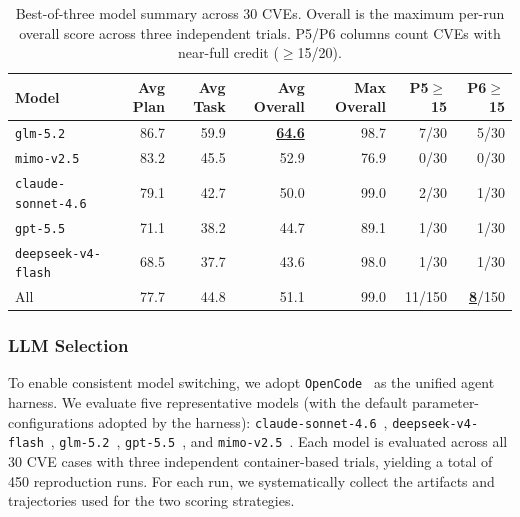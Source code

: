 \begin{table}[t]
\centering

\begin{tabular}{lrrrrrr}
\toprule
\textbf{Model} & \textbf{Avg Plan} & \textbf{Avg Task} & \textbf{Avg Overall} & \textbf{Max Overall} & \textbf{P5$\geq$15} & \textbf{P6$\geq$15} \\
\midrule
\texttt{glm-5.2} & 86.7 & 59.9 & \textbf{\underline{64.6}} & 98.7 & 7/30 & 5/30 \\
\texttt{mimo-v2.5} & 83.2 & 45.5 & 52.9 & 76.9 & 0/30 & 0/30 \\
\texttt{claude-sonnet-4.6} & 79.1 & 42.7 & 50.0 & 99.0 & 2/30 & 1/30 \\
\texttt{gpt-5.5} & 71.1 & 38.2 & 44.7 & 89.1 & 1/30 & 1/30 \\
\texttt{deepseek-v4-flash} & 68.5 & 37.7 & 43.6 & 98.0 & 1/30 & 1/30 \\
\midrule
All & 77.7 & 44.8 & 51.1 & 99.0 & 11/150 & \textbf{\underline{8}}/150 \\
\bottomrule
\end{tabular}
\caption{Best-of-three model summary across 30 CVEs. Overall is the maximum per-run overall score across three independent trials. P5/P6 columns count CVEs with near-full credit ($\geq$15/20).}
\label{tab:model-results}
\end{table}




\subsubsection{LLM Selection}
To enable consistent model switching, we adopt \texttt{OpenCode}~\cite{opencode_github} as the unified agent harness.
We evaluate five representative models (with the default parameter-configurations adopted by the harness): \texttt{claude-sonnet-4.6}~\cite{anthropic2026sonnet46}, \texttt{deepseek-v4-flash}~\cite{deepseekai2026deepseekv4}, \texttt{glm-5.2}~\cite{zeng2026glm5}, \texttt{gpt-5.5}~\cite{openai2026gpt55}, and \texttt{mimo-v2.5}~\cite{mimo2026v25pro}. Each model is evaluated across all 30 CVE cases with three independent container-based trials, yielding a total of 450 reproduction runs. For each run, we systematically collect the artifacts and trajectories used for the two scoring strategies.


